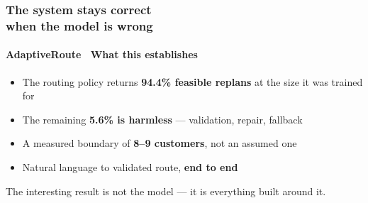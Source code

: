 \documentclass[aspectratio=169,10pt]{beamer}
\newcommand{\cy}[1]{{\color{arCyan2}\bfseries #1}}
\newcommand{\gn}[1]{{\color{arGreen}\bfseries #1}}
\newcommand{\faint}[1]{{\color{arFaint}\small #1}}
\begin{document}
\begin{frame}
  \frametitle{The system stays correct\\ when the model is wrong}
  \framesubtitle{AdaptiveRoute \textperiodcentered\ What this establishes}

  \vspace{1.3em}
  \large
  \begin{itemize}\setlength\itemsep{0.75em}
    \item[\color{arCyan}$\bullet$] The routing policy returns \gn{94.4\% feasible replans} at the
          size it was trained for
    \item[\color{arCyan}$\bullet$] The remaining \cy{5.6\% is harmless} --- validation, repair, fallback
    \item[\color{arCyan}$\bullet$] A measured boundary of \cy{8--9 customers}, not an assumed one
    \item[\color{arCyan}$\bullet$] Natural language to validated route, \cy{end to end}
  \end{itemize}

  \vspace{1.8em}
  \normalsize
  \centering
  \faint{The interesting result is not the model --- it is everything built around it.}

\end{frame}

\newcommand{\refitem}[3]{%
  {\color{arText}\footnotesize\bfseries #1}\;{\color{arFaint}\footnotesize #2}\\[0.1em]
  {\color{arMuted}\scriptsize #3}\\[0.55em]}
\end{document}

